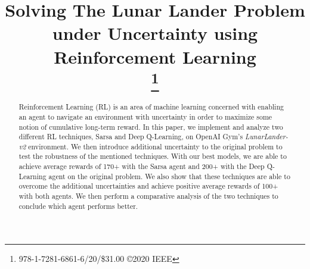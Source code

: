 \documentclass[10pt, conference]{IEEEtran}
\begin{document}
%


\title{Solving The Lunar Lander Problem under Uncertainty using Reinforcement Learning\\
\thanks{978-1-7281-6861-6/20/\$31.00 ©2020 IEEE}
}

\author{
\and
{}
}
\maketitle


\begin{abstract}
Reinforcement Learning (RL) is an area of machine learning concerned with enabling an agent to  navigate an environment with uncertainty in order to maximize some notion of cumulative long-term reward. In this paper, we implement and analyze two different RL techniques, Sarsa and Deep Q-Learning, on OpenAI Gym's \textit{LunarLander-v2} environment. We then introduce additional uncertainty to the original problem to test the robustness of the mentioned techniques. With our best models, we are able to achieve average rewards of 170+ with the Sarsa agent and 200+ with the Deep Q-Learning agent on the original problem. We also show that these techniques are able to overcome the additional uncertainties and achieve positive average rewards of 100+ with both agents. We then perform a comparative analysis of the two techniques to conclude which agent performs better.
\end{abstract}
\end{document}
